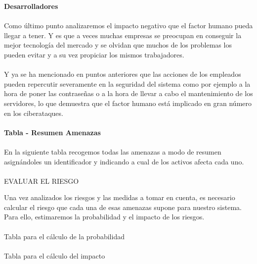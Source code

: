 \textbf{Desarrolladores}
\paragraph{}
Como último punto analizaremos el impacto negativo que el factor
humano pueda llegar a tener. Y es que a veces muchas empresas se
preocupan en conseguir la mejor tecnología del mercado y se olvidan
que muchos de los problemas los pueden evitar y a su vez propiciar los
mismos trabajadores.
\paragraph{}
Y ya se ha mencionado en puntos anteriores que las acciones de los
empleados pueden repercutir severamente en la seguridad del sistema
como por ejemplo a la hora de poner las contraseñas o a la hora de
llevar a cabo el mantenimiento de los servidores, lo que demuestra que
el factor humano está implicado en gran número en los ciberataques.

\paragraph{}
\textbf{Tabla - Resumen Amenazas}
\paragraph{}
En la siguiente tabla recogemos todas las amenazas a modo de resumen
asignándoles un identificador y indicando a cual de los activos afecta
cada uno.



\paragraph{}
EVALUAR EL RIESGO

Una vez analizados los riesgos y las medidas a tomar en cuenta, es
necesario calcular el riesgo que cada una de esas amenazas supone para
nuestro sistema. Para ello, estimaremos la probabilidad y el impacto
de los riesgos.
\paragraph{}
Tabla para el cálculo de la probabilidad
\paragraph{}
Tabla para el cálculo del impacto

